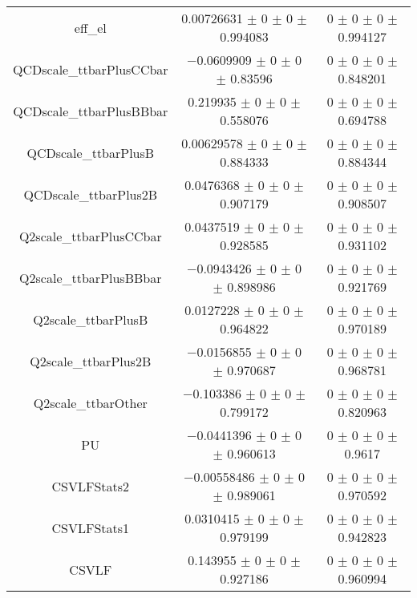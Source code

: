 \begin{table}
\begin{tabular}{ccc}
eff\_el 	& \num{0.00726631} $\pm$ \num{0} $\pm$ \num{0} $\pm$ \num{0.994083} 	& \num{0} $\pm$ \num{0} $\pm$ \num{0} $\pm$ \num{0.994127}\\
QCDscale\_ttbarPlusCCbar 	& \num{-0.0609909} $\pm$ \num{0} $\pm$ \num{0} $\pm$ \num{0.83596} 	& \num{0} $\pm$ \num{0} $\pm$ \num{0} $\pm$ \num{0.848201}\\
QCDscale\_ttbarPlusBBbar 	& \num{0.219935} $\pm$ \num{0} $\pm$ \num{0} $\pm$ \num{0.558076} 	& \num{0} $\pm$ \num{0} $\pm$ \num{0} $\pm$ \num{0.694788}\\
QCDscale\_ttbarPlusB 	& \num{0.00629578} $\pm$ \num{0} $\pm$ \num{0} $\pm$ \num{0.884333} 	& \num{0} $\pm$ \num{0} $\pm$ \num{0} $\pm$ \num{0.884344}\\
QCDscale\_ttbarPlus2B 	& \num{0.0476368} $\pm$ \num{0} $\pm$ \num{0} $\pm$ \num{0.907179} 	& \num{0} $\pm$ \num{0} $\pm$ \num{0} $\pm$ \num{0.908507}\\
Q2scale\_ttbarPlusCCbar 	& \num{0.0437519} $\pm$ \num{0} $\pm$ \num{0} $\pm$ \num{0.928585} 	& \num{0} $\pm$ \num{0} $\pm$ \num{0} $\pm$ \num{0.931102}\\
Q2scale\_ttbarPlusBBbar 	& \num{-0.0943426} $\pm$ \num{0} $\pm$ \num{0} $\pm$ \num{0.898986} 	& \num{0} $\pm$ \num{0} $\pm$ \num{0} $\pm$ \num{0.921769}\\
Q2scale\_ttbarPlusB 	& \num{0.0127228} $\pm$ \num{0} $\pm$ \num{0} $\pm$ \num{0.964822} 	& \num{0} $\pm$ \num{0} $\pm$ \num{0} $\pm$ \num{0.970189}\\
Q2scale\_ttbarPlus2B 	& \num{-0.0156855} $\pm$ \num{0} $\pm$ \num{0} $\pm$ \num{0.970687} 	& \num{0} $\pm$ \num{0} $\pm$ \num{0} $\pm$ \num{0.968781}\\
Q2scale\_ttbarOther 	& \num{-0.103386} $\pm$ \num{0} $\pm$ \num{0} $\pm$ \num{0.799172} 	& \num{0} $\pm$ \num{0} $\pm$ \num{0} $\pm$ \num{0.820963}\\
PU 	& \num{-0.0441396} $\pm$ \num{0} $\pm$ \num{0} $\pm$ \num{0.960613} 	& \num{0} $\pm$ \num{0} $\pm$ \num{0} $\pm$ \num{0.9617}\\
CSVLFStats2 	& \num{-0.00558486} $\pm$ \num{0} $\pm$ \num{0} $\pm$ \num{0.989061} 	& \num{0} $\pm$ \num{0} $\pm$ \num{0} $\pm$ \num{0.970592}\\
CSVLFStats1 	& \num{0.0310415} $\pm$ \num{0} $\pm$ \num{0} $\pm$ \num{0.979199} 	& \num{0} $\pm$ \num{0} $\pm$ \num{0} $\pm$ \num{0.942823}\\
CSVLF 	& \num{0.143955} $\pm$ \num{0} $\pm$ \num{0} $\pm$ \num{0.927186} 	& \num{0} $\pm$ \num{0} $\pm$ \num{0} $\pm$ \num{0.960994}\\

\end{tabular}
\end{table}
